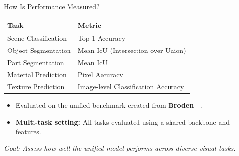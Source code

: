 \documentclass{beamer}
\begin{document}
\begin{frame}{How Is Performance Measured?}
  \vspace{0.4cm}
  \begin{tabular}{ll}
    \textbf{Task} & \textbf{Metric} \\
    \hline
    Scene Classification & Top-1 Accuracy \\
    Object Segmentation & Mean IoU (Intersection over Union) \\
    Part Segmentation & Mean IoU \\
    Material Prediction & Pixel Accuracy \\
    Texture Prediction & Image-level Classification Accuracy \\
  \end{tabular}
  \vspace{0.5cm}
  \begin{itemize}
    \item Evaluated on the unified benchmark created from \textbf{Broden+}.
    \item \textbf{Multi-task setting:} All tasks evaluated using a shared backbone and features.
  \end{itemize}
  \vfill
  \textit{Goal: Assess how well the unified model performs across diverse visual tasks.}
\end{frame}
\end{document}
